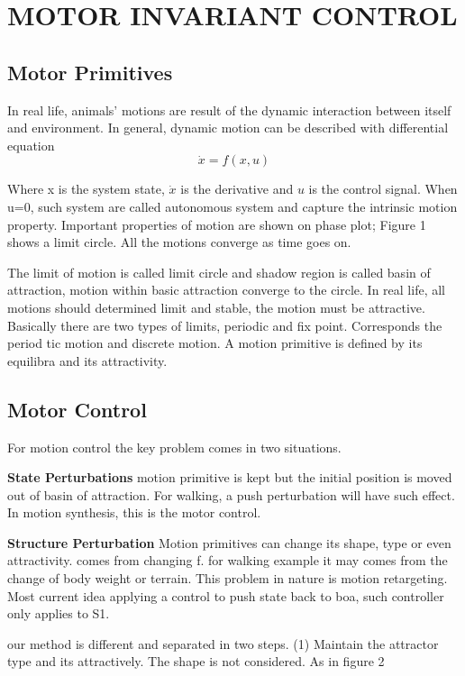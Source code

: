 \section{MOTOR INVARIANT CONTROL}
\subsection{Motor Primitives}
In real life, animals’ motions are result of the dynamic interaction between itself and environment.
In general, dynamic motion can be described with differential equation
\begin{equation}
	\dot{x}=f(x,u)
\end{equation}

Where x is the system state, $\dot{x}$ is the derivative and $u$ is the control signal. 
When u=0, such system are called autonomous system and capture the intrinsic motion property. 
Important properties of motion are shown on phase plot; 
Figure 1 shows a limit circle. 
All the motions converge as time goes on.
\begin{figure}
\end{figure}

The limit of motion is called limit circle and shadow region is called basin of attraction, 
motion within basic attraction converge to the circle.
In real life, all motions should determined limit and stable, the motion must be attractive.
Basically there are two types of limits, periodic and fix point. 
Corresponds the period tic motion and discrete motion.
A motion primitive is defined by its equilibra and its attractivity.

\subsection{Motor Control}
For motion control the key problem comes in two situations.

\textbf{State Perturbations} motion primitive is kept but the initial position is moved out of basin of attraction.
For walking, a push perturbation will have such effect. In motion synthesis, this is the motor control.

\textbf{Structure Perturbation}
Motion primitives can change its shape, type or even attractivity.
comes from changing f. for walking example it may comes from the change of body weight or terrain. This problem in nature is motion retargeting.
Most current idea applying a control to push state back to boa, such controller only applies to S1.

our method is different and  separated in two steps.
(1) Maintain the attractor type and its attractively. The shape is not considered. As in figure 2

